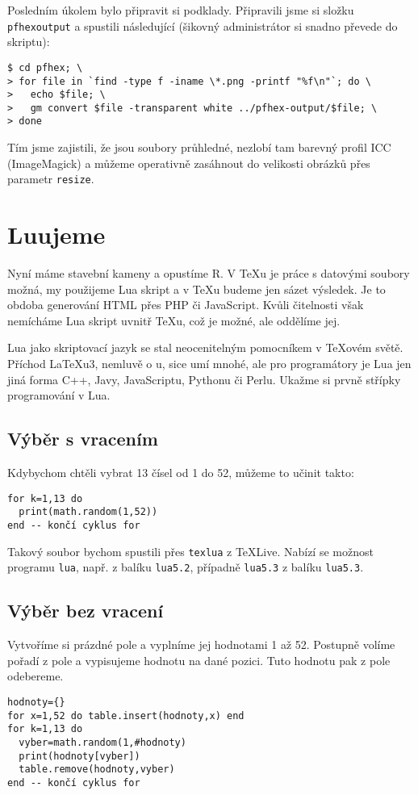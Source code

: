 Posledním úkolem bylo připravit si podklady. Připravili jsme si složku \texttt{pfhex\z output} a spustili následující (šikovný administrátor si snadno převede do skriptu): %

\newpage
\begin{lstlisting}
$ cd pfhex; \
> for file in `find -type f -iname \*.png -printf "%f\n"`; do \
>   echo $file; \
>   gm convert $file -transparent white ../pfhex-output/$file; \
> done
\end{lstlisting}

Tím jsme zajistili, že jsou soubory průhledné, nezlobí tam barevný profil ICC (ImageMagick) a můžeme operativně zasáhnout do velikosti obrázků přes parametr \texttt{resize}.

\section{Luujeme}
Nyní máme stavební kameny a opustíme R. V \TeX u je práce s datovými soubory možná, my použijeme Lua skript a v \TeX u budeme jen sázet výsledek. Je to obdoba generování HTML přes PHP či JavaScript. Kvůli čitelnosti však nemícháme Lua skript uvnitř \TeX u, což je možné, ale oddělíme jej.

Lua jako skriptovací jazyk se stal neocenitelným pomocníkem v \TeX ovém světě. Příchod \LaTeX u3, nemluvě o \ConTeXt u, sice umí mnohé, ale pro  programátory je Lua jen jiná forma C++, Javy, JavaScriptu, Pythonu či Perlu. Ukažme si prvně střípky programování v Lua.

\subsection{Výběr s vracením}
Kdybychom chtěli vybrat 13 čísel od 1 do 52, 
můžeme to učinit takto:
\begin{lstlisting}
for k=1,13 do
  print(math.random(1,52))
end -- končí cyklus for
\end{lstlisting}
Takový soubor bychom spustili přes \texttt{texlua} z \TeX Live. Nabízí se možnost programu \texttt{lua}, např. z balíku \texttt{lua5.2}, případně \texttt{lua5.3} z balíku \texttt{lua5.3}.

\subsection{Výběr bez vracení}
Vytvoříme si prázdné pole a vyplníme jej hodnotami 1 až 52. Postupně volíme pořadí z pole a vypisujeme hodnotu na dané pozici. Tuto hodnotu pak z pole odebereme.
\begin{lstlisting}
hodnoty={}
for x=1,52 do table.insert(hodnoty,x) end
for k=1,13 do
  vyber=math.random(1,#hodnoty)
  print(hodnoty[vyber])
  table.remove(hodnoty,vyber)
end -- končí cyklus for
\end{lstlisting}

